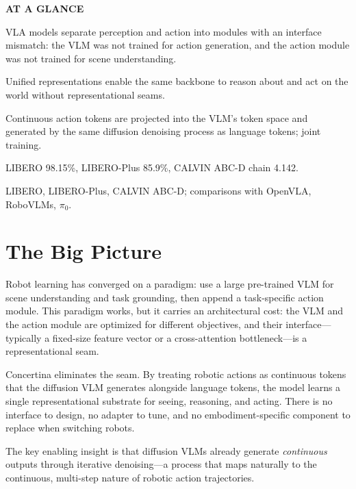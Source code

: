 \documentclass[10pt,twocolumn]{article}
\begin{document}
\begin{mdframed}[backgroundcolor=boxgray,linecolor=rulered,linewidth=1pt,
    innerleftmargin=6pt,innerrightmargin=6pt,
    innertopmargin=6pt,innerbottommargin=6pt]
\textbf{\small AT A GLANCE}\par\vspace{4pt}
\begin{description}[leftmargin=0pt,labelsep=4pt,itemsep=2pt,parsep=0pt,
    font=\small\bfseries]
  \item[Problem:] VLA models separate perception and action into modules with an interface mismatch: the VLM was not trained for action generation, and the action module was not trained for scene understanding.
  \item[Why it matters:] Unified representations enable the same backbone to reason about and act on the world without representational seams.
  \item[Method:] Continuous action tokens are projected into the VLM's token space and generated by the same diffusion denoising process as language tokens; joint training.
  \item[Result:] LIBERO 98.15\%, LIBERO-Plus 85.9\%, CALVIN ABC-D chain 4.142.
  \item[Evidence:] LIBERO, LIBERO-Plus, CALVIN ABC-D; comparisons with OpenVLA, RoboVLMs, $\pi_0$.
\end{description}
\end{mdframed}

\section{The Big Picture}

Robot learning has converged on a paradigm: use a large pre-trained VLM for scene understanding and task grounding, then append a task-specific action module.
This paradigm works, but it carries an architectural cost: the VLM and the action module are optimized for different objectives, and their interface---typically a fixed-size feature vector or a cross-attention bottleneck---is a representational seam.

Concertina eliminates the seam.
By treating robotic actions as continuous tokens that the diffusion VLM generates alongside language tokens, the model learns a single representational substrate for seeing, reasoning, and acting.
There is no interface to design, no adapter to tune, and no embodiment-specific component to replace when switching robots.

The key enabling insight is that diffusion VLMs already generate \emph{continuous} outputs through iterative denoising---a process that maps naturally to the continuous, multi-step nature of robotic action trajectories.
\end{document}

